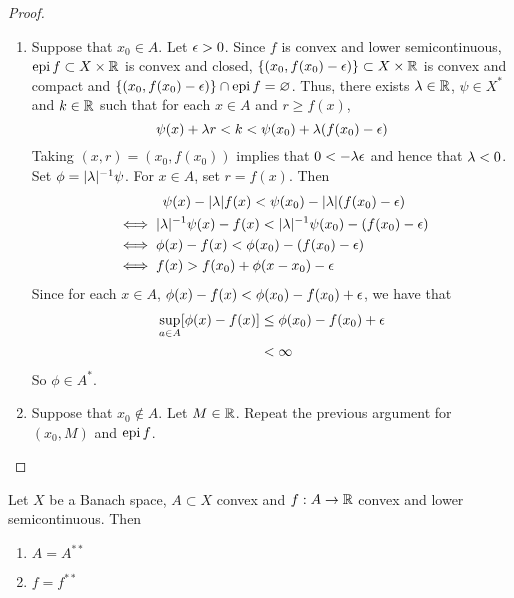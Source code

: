 \documentclass{book}
\begin{document}
	\begin{proof}\
		\begin{enumerate}
			\item Suppose that $x_0 \in A$. Let $\epsilon >0$. Since $f$ is convex and lower semicontinuous, $\operatorname{epi} f \subset X \times \mathbb{R}$ is convex and closed, $\{(x_0, f(x_0) - \epsilon)\} \subset X \times \mathbb{R}$ is convex and compact and $\{(x_0, f(x_0) - \epsilon)\} \cap \operatorname{epi} f = \varnothing$. Thus, there exists $\lambda \in \mathbb{R}$, $\psi \in X^*$ and $k \in \mathbb{R}$ such that for each $x \in A$ and $r \geq f(x)$, 
			$$\psi(x) + \lambda r < k < \psi(x_0) + \lambda (f(x_0) - \epsilon)$$
			Taking $(x, r) = (x_0, f(x_0))$ implies that $0 < -\lambda \epsilon $ and hence that $\lambda < 0$. Set $\phi = |\lambda|^{-1}\psi$. For $x \in A$, set $r = f(x)$. Then 
			\begin{align*}
				& \hspace{1.2cm} \psi(x) -|\lambda| f(x) < \psi(x_0) - |\lambda| (f(x_0) - \epsilon) \\
				& \iff |\lambda|^{-1} \psi(x) - f(x) < |\lambda|^{-1}\psi(x_0) - (f(x_0) - \epsilon) \\
				& \iff \phi(x) - f(x) < \phi(x_0) - (f(x_0) - \epsilon) \\
				& \iff f(x) > f(x_0) + \phi(x-x_0) - \epsilon 
			\end{align*}
			Since for each $x \in A$, $\phi(x) - f(x) < \phi(x_0) - f(x_0) + \epsilon$, we have that 
			\begin{align*}
				\sup_{a \in A}[\phi(x) - f(x)] 
				& \leq \phi(x_0) - f(x_0) + \epsilon \\
				&< \infty
			\end{align*}
			So $\phi \in A^*$.
			\item Suppose that $x_0 \not \in A$. Let $M \in \mathbb{R}$. Repeat the previous argument for $(x_0, M)$ and $\operatorname{epi} f$.
		\end{enumerate}
	\end{proof}

	\begin{ex}
		Let $X$ be a Banach space, $A \subset X$ convex and $f:A \rightarrow \mathbb{R}$ convex and lower semicontinuous. Then 
		\begin{enumerate}
			\item $A = A^{**}$
			\item $f = f^{**}$
		\end{enumerate}
	\end{ex}
\end{document}
